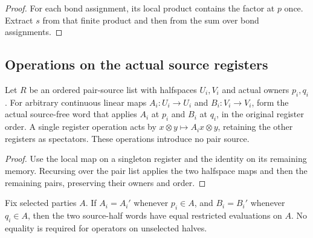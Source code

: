 \begin{proof}
    \leanok
    For each bond assignment, its local product contains the factor at $p$
    once. Extract $s$ from that finite product and then from the sum over bond
    assignments.
\end{proof}

\subsection{Operations on the actual source registers}
\begin{definition}
    \label{def:peps_chrono_endpoint_word}
    \leanok
    Let $R$ be an ordered pair-source list with halfspaces $U_i,V_i$ and actual
    owners $p_i,q_i$. For arbitrary continuous linear maps
    $A_i:U_i\to U_i$ and $B_i:V_i\to V_i$, form the actual source-free word that
    applies $A_i$ at $p_i$ and $B_i$ at $q_i$, in the original register order.
    A single register operation acts by $x\otimes y\mapsto A_i x\otimes y$,
    retaining the other registers as spectators. These operations introduce no
    pair source.
\end{definition}

\begin{proof}
    \leanok
    Use the local map on a singleton register and the identity on its remaining
    memory. Recursing over the pair list applies the two halfspace maps and then
    the remaining pairs, preserving their owners and order.
\end{proof}

\begin{theorem}
    \label{thm:peps_chrono_endpoint_locality}
    \leanok
    Fix selected parties $A$. If $A_i=A_i'$ whenever $p_i\in A$, and
    $B_i=B_i'$ whenever $q_i\in A$, then the two source-half words have equal
    restricted evaluations on $A$. No equality is required for operators on
    unselected halves.
\end{theorem}

